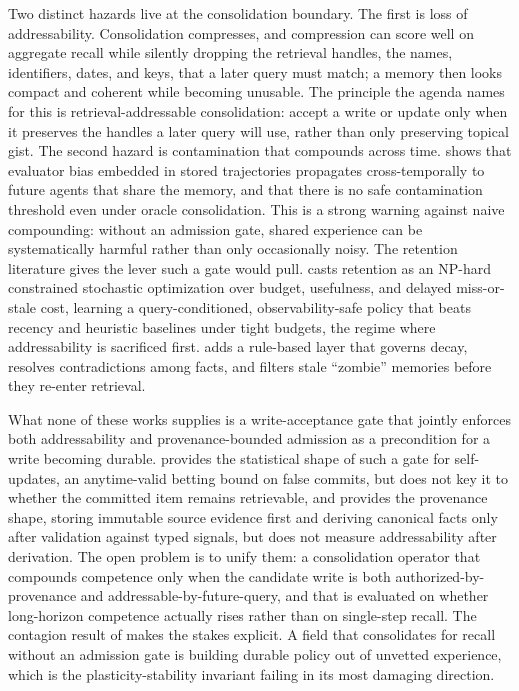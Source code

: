 Two distinct hazards live at the consolidation boundary. The first is loss of
addressability. Consolidation compresses, and compression can score well on aggregate
recall while silently dropping the retrieval handles, the names, identifiers, dates,
and keys, that a later query must match; a memory then looks compact and coherent
while becoming unusable. The principle the agenda names for this is
retrieval-addressable consolidation: accept a write or update only when it preserves
the handles a later query will use, rather than only preserving topical gist. The
second hazard is contamination that compounds across time. \citet{liu2026memorycontagion}
shows that evaluator bias embedded in stored trajectories propagates
cross-temporally to future agents that share the memory, and that there is no safe
contamination threshold even under oracle consolidation. This is a strong warning
against naive compounding: without an admission gate, shared experience can be
systematically harmful rather than only occasionally noisy. The retention literature gives the lever such a gate would pull.
\citet{kang2026oslmr} casts retention as an NP-hard constrained stochastic
optimization over budget, usefulness, and delayed miss-or-stale cost, learning a
query-conditioned, observability-safe policy that beats recency and heuristic
baselines under tight budgets, the regime where addressability is
sacrificed first. \citet{kumar2026memarchitect} adds a rule-based layer that governs
decay, resolves contradictions among facts, and filters stale ``zombie'' memories
before they re-enter retrieval.

What none of these works supplies is a write-acceptance gate that jointly enforces
both addressability and provenance-bounded admission as a precondition for a write
becoming durable. \citet{shawn2026pace} provides the statistical shape of such a
gate for self-updates, an anytime-valid betting bound on false commits, but does not
key it to whether the committed item remains retrievable, and \citet{joshi2026eywa}
provides the provenance shape, storing immutable source evidence first and deriving
canonical facts only after validation against typed signals, but does not measure
addressability after derivation. The open problem is to unify them: a consolidation
operator that compounds competence only when the candidate write is both
authorized-by-provenance and addressable-by-future-query, and that is evaluated on
whether long-horizon competence actually rises rather than on single-step recall.
The contagion result of \citet{liu2026memorycontagion} makes the stakes explicit.
A field that consolidates for recall without an admission gate is building durable
policy out of unvetted experience, which is the plasticity-stability invariant
failing in its most damaging direction.

